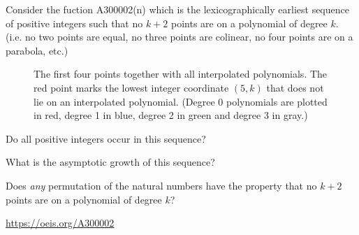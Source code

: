 \documentclass{article}
\begin{document}
Consider the fuction A300002(n) which is the lexicographically earliest
sequence of positive integers such that no $k + 2$ points are on a polynomial
of degree $k$. (i.e. no two points are equal, no three points are colinear, no
four points are on a parabola, etc.)
\begin{figure}[!h]
  \centering
  \caption{
    The first four points together with all interpolated polynomials.
    The red point marks the lowest integer coordinate $(5, k)$ that does not
    lie on an interpolated polynomial. (Degree 0 polynomials are plotted in red,
    degree 1 in blue, degree 2 in green and degree 3 in gray.)
  }
\end{figure}

\begin{question}
  Do all positive integers occur in this sequence?
\end{question}

\begin{related}
  \item What is the asymptotic growth of this sequence?
  \item Does \textit{any} permutation of the natural numbers have the property
  that no $k + 2$ points are on a polynomial of degree $k$?
\end{related}

\begin{references}
  \item \url{https://oeis.org/A300002}
\end{references}
\end{document}
